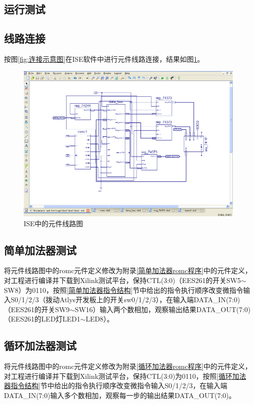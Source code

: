 \documentclass[a4paper]{ctexart}
\begin{document}
\begin{spacing}{1.3}
\section{运行测试}
\subsection{线路连接}
按图\ref{fig:连接示意图}在ISE软件中进行元件线路连接，结果如图\ref{fig:线路图}。

\begin{figure}[htbp]
	\centering
	\includegraphics[width=\textwidth]{figure/final.PNG}
	\caption{ISE中的元件线路图}\label{fig:线路图}
\end{figure}

\subsection{简单加法器测试}
将元件线路图中的romc元件定义修改为附录\ref{简单加法器romc程序}中的元件定义，对工程进行编译并下载到Xilink测试平台，保持CTL(3:0)（EES261的开关SW5$\sim$SW8）为0110，按照\ref{简单加法器指令结构}节中给出的指令执行顺序改变微指令输入S0/1/2/3（拨动Atlys开发板上的开关sw0/1/2/3），在输入端DATA\_IN(7:0)（EES261的开关SW9$\sim$SW16）输入两个数相加，观察输出结果DATA\_OUT(7:0)（EES261的LED灯LED1$\sim$LED8）。

\subsection{循环加法器测试}
将元件线路图中的romc元件定义修改为附录\ref{循环加法器romc程序}中的元件定义，对工程进行编译并下载到Xilink测试平台，保持CTL(3:0)为0110，按照\ref{循环加法器指令结构}节中给出的指令执行顺序改变微指令输入S0/1/2/3，在输入端DATA\_IN(7:0)输入多个数相加，观察每一步的输出结果DATA\_OUT(7:0)。


\end{spacing}
\end{document}
